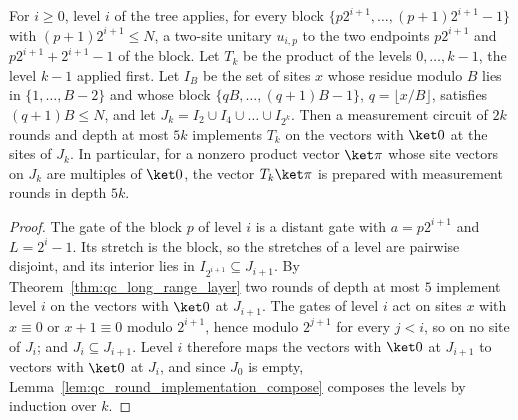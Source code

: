 \begin{lemma}
    \label{thm:ldp_tree_measurements}
    \leanok
    For $i\ge0$, level $i$ of the tree applies, for every block
    $\{p2^{i+1},\dots,(p+1)2^{i+1}-1\}$ with $(p+1)2^{i+1}\le N$, a two-site
    unitary $u_{i,p}$ to the two endpoints $p2^{i+1}$ and
    $p2^{i+1}+2^{i+1}-1$ of the block. Let $T_k$ be the product of the levels
    $0,\dots,k-1$, the level $k-1$ applied first. Let $I_B$ be the set of
    sites $x$ whose residue modulo $B$ lies in $\{1,\dots,B-2\}$ and whose
    block $\{qB,\dots,(q+1)B-1\}$, $q=\lfloor x/B\rfloor$, satisfies
    $(q+1)B\le N$, and let $J_k=I_2\cup I_4\cup\dots\cup I_{2^k}$. Then a
    measurement circuit of $2k$ rounds and depth at most $5k$ implements $T_k$ on the
    vectors with $\ket0$ at the sites of $J_k$. In particular, for a nonzero product vector $\ket\pi$
    whose site vectors on $J_k$ are multiples of $\ket0$, the vector
    $T_k\ket\pi$ is prepared with measurement rounds in depth $5k$.
\end{lemma}
\begin{proof}
    \leanok
    The gate of the block $p$ of level $i$ is a distant gate with $a=p2^{i+1}$
    and $L=2^i-1$. Its stretch is the block, so the stretches of a level are
    pairwise disjoint, and its interior lies in $I_{2^{i+1}}\subseteq J_{i+1}$.
    By Theorem~\ref{thm:qc_long_range_layer} two rounds of depth at most $5$ implement
    level $i$ on the vectors with $\ket0$ at $J_{i+1}$. The gates of level $i$
    act on sites $x$ with $x\equiv0$ or $x+1\equiv0$ modulo $2^{i+1}$, hence
    modulo $2^{j+1}$ for every $j<i$, so on no site of $J_i$; and
    $J_i\subseteq J_{i+1}$. Level $i$ therefore maps the vectors with $\ket0$ at
    $J_{i+1}$ to vectors with $\ket0$ at $J_i$, and since $J_0$ is empty,
    Lemma~\ref{lem:qc_round_implementation_compose} composes the levels by
    induction over $k$.
\end{proof}

